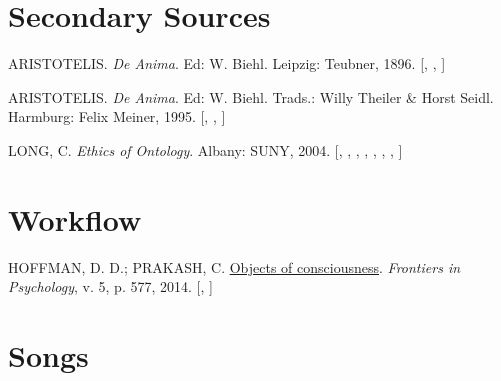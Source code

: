\documentclass[
  10pt,
  oneside,
  cleardoublepage=empty,
  numbers=noenddot,
  titlepage,
  toclink=all,
  toc=bibliography,
  headinclude,
  footinclude]{scrbook}
\newlength{\cslhangindent}
\newenvironment{CSLReferences}[2] %
 {\begin{list}{}{%
  \setlength{\itemindent}{0pt}
  \setlength{\leftmargin}{0pt}
  \setlength{\parsep}{0pt}
  \ifodd #1
   \setlength{\leftmargin}{\cslhangindent}
   \setlength{\itemindent}{-1\cslhangindent}
  \fi
  \setlength{\itemsep}{#2\baselineskip}}}
 {\end{list}}
\theoremstyle{plain}
\theoremstyle{plain}
\theoremstyle{definition}
\theoremstyle{definition}
\theoremstyle{plain}
\theoremstyle{plain}
\theoremstyle{definition}
\theoremstyle{plain}
\theoremstyle{remark}
\begin{document}
\section*{Secondary Sources}\label{sec-secondary-sources}

\label{refs_secondary-sources}
\begin{CSLReferences}{0}{1}
ARISTOTELIS. \emph{De Anima}. Ed: W. Biehl. Leipzig: Teubner, 1896.
{[},
\hyperref[cite_26]{\pageref{cite_26}},
\hyperref[cite_27]{\pageref{cite_27}}{]}

ARISTOTELIS. \emph{De Anima}. Ed: W. Biehl. Trads.: Willy Theiler \&
Horst Seidl. Harmburg: Felix Meiner, 1995.
{[},
\hyperref[cite_28]{\pageref{cite_28}},
\hyperref[cite_29]{\pageref{cite_29}}{]}

LONG, C. \emph{Ethics of Ontology}. Albany: SUNY, 2004.
{[},
\hyperref[cite_5]{\pageref{cite_5}},
\hyperref[cite_6]{\pageref{cite_6}},
\hyperref[cite_7]{\pageref{cite_7}},
\hyperref[cite_8]{\pageref{cite_8}},
\hyperref[cite_9]{\pageref{cite_9}},
\hyperref[cite_10]{\pageref{cite_10}},
\hyperref[cite_11]{\pageref{cite_11}}{]}

\end{CSLReferences}

\section*{Workflow}\label{sec-workflow}

\label{refs_workflow}
\begin{CSLReferences}{0}{1}
HOFFMAN, D. D.; PRAKASH, C.
\href{https://doi.org/10.3389/fpsyg.2014.00577}{Objects of
consciousness}. \emph{Frontiers in Psychology}, v. 5, p. 577, 2014.
{[},
\hyperref[cite_12]{\pageref{cite_12}}{]}

\end{CSLReferences}

\section*{Songs}\label{sec-songs}
\end{document}
